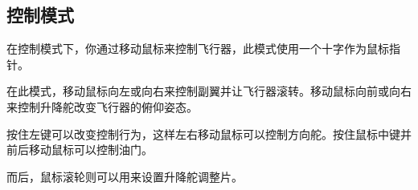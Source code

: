 \ifchinese
\subsection{控制模式}
\fi

{}

\ifchinese
在控制模式下，你通过移动鼠标来控制飞行器，此模式使用一个十字作为鼠标指针。

在此模式，移动鼠标向左或向右来控制副翼并让飞行器滚转。移动鼠标向前或向右来控制升降舵改变飞行器的俯仰姿态。

按住左键可以改变控制行为，这样左右移动鼠标可以控制方向舵。按住鼠标中键并前后移动鼠标可以控制油门。

而后，鼠标滚轮则可以用来设置升降舵调整片。

